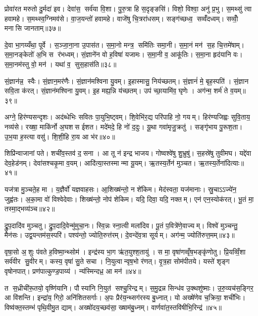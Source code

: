 प्रोवा॑रत मरुतो दु॒र्मदा॑ इव। देवा॑स॒ सर्व॑या वि॒शा। पु॒रु॒त्रा हि स॒दृङ्ङसि॑। विशो॒ विश्वा॒ अनु॑ प्र॒भु। स॒मथ्सु॑ त्वा हवामहे। स॒मथ्स्व॒ग्निमव॑से। वा॒ज॒यन्तो॑ हवामहे। वाजे॑षु चि॒त्ररा॑धसम्। सङ्ग॑च्छध्व॒ सव्वँ॑दध्वम्। सव्वोँ॒ मनासि जानताम्॥३७॥

दे॒वा भा॒गय्यँथा॒ पूर्वे। स॒ञ्जा॒ना॒ना उ॒पास॑त। स॒मा॒नो मन्त्र॒ समि॑तिः समा॒नी। स॒मा॒नं मन॑ स॒ह चि॒त्तमे॑षाम्। स॒मा॒नङ्केतो॑ अ॒भि स र॑भध्वम्। सं॒ज्ञाने॑न वो ह॒विषा॑ यजामः। स॒मा॒नी व॒ आकू॑तिः। स॒मा॒ना हृद॑यानि वः। स॒मा॒नम॑स्तु वो॒ मन॑। यथा॑ व॒ सुस॒हास॑ति॥३८॥

सं॒ज्ञान॑न्न॒ स्वैः। सं॒ज्ञान॒मर॑णैः। सं॒ज्ञान॑मश्विना यु॒वम्। इ॒हास्मासु॒ निय॑च्छतम्। सं॒ज्ञानं॑ मे॒ बृह॒स्पति॑। सं॒ज्ञान सवि॒ता क॑रत्। सं॒ज्ञान॑मश्विना यु॒वम्। इ॒ह मह्य॒न्नि य॑च्छतम्। उप॑ च्छा॒यामि॑व॒ घृणेः। अग॑न्म॒ शर्म॑ ते व॒यम्॥३९॥

अग्ने॒ हिर॑ण्यसन्दृशः। अद॑ब्धेभिः सवितः पा॒युभि॒ष्ट्वम्। शि॒वेभि॑र॒द्य परि॑पाहि नो॒ गयम्। हिर॑ण्यजिह्वः सुवि॒ताय॒ नव्य॑से। रख्षा॒ माकि॑र्नो अ॒घशस ईशत। मदे॑मदे॒ हि नो॑ द॒दुः। यू॒था गवा॑मृजु॒क्रतु॑। सङ्गृ॑भाय पु॒रूश॒ता। उ॒भ॒या ह॒स्त्या वसु॑। शि॒शी॒हि रा॒य आ भ॑र॥४०॥

शिप्रि॑न्वाजानां पते। शची॑व॒स्तव॑ द॒सना। आ तू न॑ इन्द्र भाजय। गोष्वश्वे॑षु शु॒भ्रुषु॑। स॒हस्रे॑षु तुवीमघ। यद्दे॑वा देव॒हेड॑नम्। देवा॑सश्चकृ॒मा व॒यम्। आदि॑त्या॒स्तस्मान्मा यू॒यम्। ऋ॒तस्य॒र्तेन॑ मुञ्चत। ऋ॒तस्य॒र्तेना॑दित्याः॥४१॥

यज॑त्रा मु॒ञ्चते॒ह मा। य॒ज्ञैर्वो॑ यज्ञवाहसः। आ॒शिख्ष॑न्तो॒ न शे॑किम। मेद॑स्वता॒ यज॑मानाः। स्रु॒चाऽऽज्ये॑न॒ जुह्व॑तः। अ॒का॒मा वो॑ विश्वेदेवाः। शिख्ष॑न्तो॒ नोप॑ शेकिम। यदि॒ दिवा॒ यदि॒ नक्तम्। एन॑ एन॒स्योक॑रत्। भू॒तं मा॒ तस्मा॒द्भव्य॑ञ्च॥४२॥

द्रु॒प॒दादि॑व मुञ्चतु। द्रु॒प॒दादि॒वेन्मु॑मुचा॒नः। स्वि॒न्नः स्ना॒त्वी मला॑दिव। पू॒तं प॒वित्रे॑णे॒वाज्यम्। विश्वे॑ मुञ्चन्तु॒ मैन॑सः। उद्व॒यन्तम॑स॒स्परि॑। पश्य॑न्तो॒ ज्योति॒रुत्त॑रम्। दे॒वन्दे॑व॒त्रा सूर्यम्। अग॑न्म॒ ज्योति॑रुत्त॒मम्॥४३॥\anuvakamend[तव॑ कृधि॒ वन॒स्पतीञ्जानता॒मस॑ति व॒यं भ॑रादित्याश्च॒ नव॑ च]

वृषा॒सो अ॒शुः प॑वते ह॒विष्मा॒न्थ्सोम॑। इन्द्र॑स्य भा॒ग ऋ॑त॒युश्श॒तायु॑। स मा॒ वृषा॑णव्वृँष॒भङ्कृ॑णोतु। प्रि॒यव्विँ॒शा सर्व॑वीर सु॒वीरम्। कस्य॒ वृषा॑ सु॒ते सचा। नि॒युत्वान्वृष॒भो र॑णत्। वृ॒त्र॒हा सोम॑पीतये। यस्ते॑ शृङ्ग वृषोनपात्। प्रण॑पात्कुण्ड॒पाय्य॑। न्य॑स्मिन्दध्र॒ आ मन॑॥४४॥

त स॒ध्रीची॑रू॒तयो॒ वृष्णि॑यानि। पौस्या॑नि नि॒युत॑ सश्चु॒रिन्द्रम्। स॒मु॒द्रन्न सिन्ध॑व उ॒क्थशु॑ष्माः। उ॒रु॒व्यच॑स॒ङ्गिर॒ आ वि॑शन्ति। इन्द्रा॑य॒ गिरो॒ अनि॑शितसर्गाः। अ॒पः प्रैर॑य॒न्थ्सग॑रस्य बु॒ध्नात्। यो अख्षे॑णेव च॒क्रिया॒ शची॑भिः। विष्व॑क्त॒स्तम्भ॑ पृथि॒वीमु॒त द्याम्। अख्षो॑दय॒च्छव॑सा॒ ख्षाम॑बु॒ध्नम्। वार्णवा॑त॒स्तवि॑षीभि॒रिन्द्र॑॥४५॥

